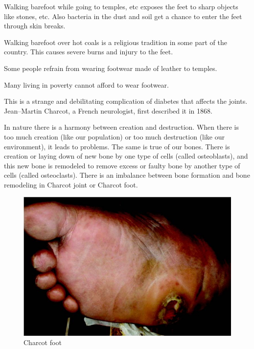 {\item Walking barefoot while going to temples, etc exposes the feet to sharp objects like stones, etc. Also bacteria in the dust and soil get a chance to enter the feet through skin breaks.

 \item Walking barefoot over hot coals is a religious tradition in some part of the country. This causes severe burns and injury to the feet.

 \item Some people refrain from wearing footwear made of leather to temples.

 \item Many living in poverty cannot afford to wear footwear.


This is a strange and debilitating complication of diabetes that affects the joints. Jean–Martin Charcot, a French neurologist, first described it in 1868.

In nature there is a harmony between creation and destruction. When there is too much creation (like our population) or too much destruction (like our environment), it leads to problems. The same is true of our bones. There is creation or laying down of new bone by one type of cells (called osteoblasts), and this new bone is remodeled to remove excess or faulty bone by another type of cells (called osteoclasts). There is an imbalance between bone formation and bone remodeling in Charcot joint or Charcot foot.

\begin{figure}
\includegraphics{images/071.jpg}
\caption{Charcot foot}
\end{figure}

}

